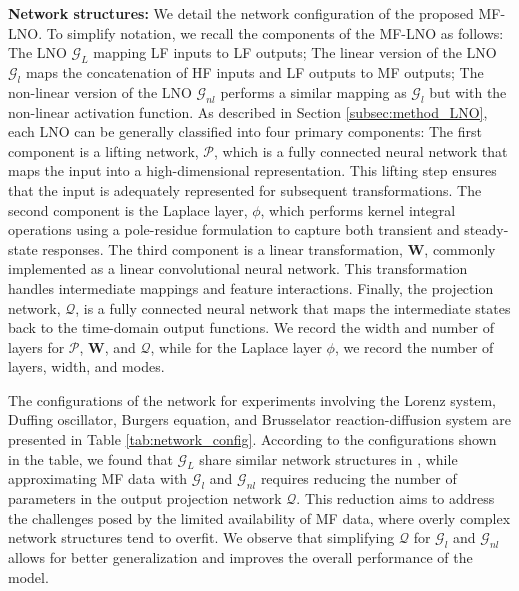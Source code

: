 \textbf{Network structures:} We detail the network configuration of the proposed MF-LNO. To simplify notation, we recall the components of the MF-LNO as follows: The LNO $\mathcal G_L$ mapping LF inputs to LF outputs; The linear version of the LNO $\mathcal G_{l}$ maps the concatenation of HF inputs and LF outputs to MF outputs; The non-linear version of the LNO $\mathcal G_{nl}$ performs a similar mapping as $\mathcal G_{l}$ but with the non-linear activation function. As described in Section \ref{subsec:method_LNO}, each LNO can be generally classified into four primary components:  The first component is a lifting network, $ \mathcal{P} $, which is a fully connected neural network that maps the input into a high-dimensional representation. This lifting step ensures that the input is adequately represented for subsequent transformations. The second component is the Laplace layer, $ \phi $, which performs kernel integral operations using a pole-residue formulation to capture both transient and steady-state responses. The third component is a linear transformation, $ \mathbf{W} $, commonly implemented as a linear convolutional neural network. This transformation handles intermediate mappings and feature interactions. Finally, the projection network, $ \mathcal{Q} $, is a fully connected neural network that maps the intermediate states back to the time-domain output functions. We record the width and number of layers for $ \mathcal{P} $, $ \mathbf{W} $, and $ \mathcal{Q} $, while for the Laplace layer $ \phi $, we record the number of layers, width, and modes.

The configurations of the network for experiments involving the Lorenz system, Duffing oscillator, Burgers equation, and Brusselator reaction-diffusion system are presented in Table \ref{tab:network_config}. According to the configurations shown in the table, we found that $\mathcal G_L$ share similar network structures in \citep{cao2024laplace}, while approximating MF data with $ \mathcal{G}_l $ and $ \mathcal{G}_{nl} $ requires reducing the number of parameters in the output projection network $ \mathcal{Q} $. This reduction aims to address the challenges posed by the limited availability of MF data, where overly complex network structures tend to overfit. We observe that simplifying $ \mathcal{Q} $ for $\mathcal G_{l}$ and $\mathcal G_{nl}$ allows for better generalization and improves the overall performance of the model.
